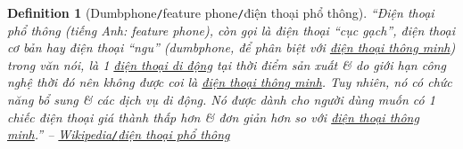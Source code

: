 \documentclass[12pt,oneside]{book}
\newtheorem{definition}{Definition}[section]
\begin{document}
\begin{definition}[Dumbphone{\tt/}feature phone{\tt/}điện thoại phổ thông]
	\label{def: dumbphone}
	``\emph{Điện thoại phổ thông} (tiếng Anh: \emph{feature phone}), còn gọi là điện thoại ``cục gạch'', điện thoại cơ bản hay điện thoại ``ngu'' (\emph{dumbphone}, để phân biệt với \href{https://vi.wikipedia.org/wiki/%C4%90i%E1%BB%87n_tho%E1%BA%A1i_th%C3%B4ng_minh}{điện thoại thông minh}) trong văn nói, là 1 \href{https://vi.wikipedia.org/wiki/%C4%90i%E1%BB%87n_tho%E1%BA%A1i_di_%C4%91%E1%BB%99ng}{điện thoại di động} tại thời điểm sản xuất \& do giới hạn công nghệ thời đó nên không được coi là \href{https://vi.wikipedia.org/wiki/%C4%90i%E1%BB%87n_tho%E1%BA%A1i_th%C3%B4ng_minh}{điện thoại thông minh}. Tuy nhiên, nó có chức năng bổ sung \& các dịch vụ di động. Nó được dành cho người dùng muốn có 1 chiếc điện thoại giá thành thấp hơn \& đơn giản hơn so với \href{https://vi.wikipedia.org/wiki/%C4%90i%E1%BB%87n_tho%E1%BA%A1i_th%C3%B4ng_minh}{điện thoại thông minh}.'' -- \href{https://vi.wikipedia.org/wiki/%C4%90i%E1%BB%87n_tho%E1%BA%A1i_ph%E1%BB%95_th%C3%B4ng}{Wikipedia\emph{{\tt/}}điện thoại phổ thông}
\end{definition}
\end{document}
